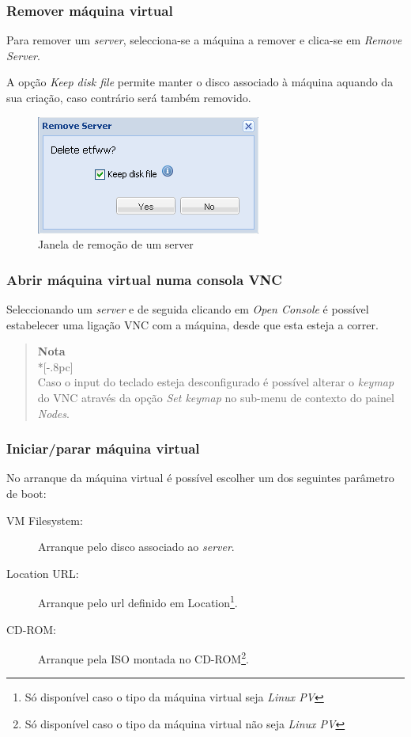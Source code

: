 \subsubsection{Remover máquina virtual}
\label{sec:remove_server}
Para remover um \emph{server}, selecciona-se a máquina a remover e clica-se em \emph{Remove Server}.

A opção \emph{Keep disk file} permite manter o disco associado à máquina aquando da sua criação, caso contrário será também removido.
		
\begin{figure}[H]
	\begin{center}
	\includegraphics[scale=0.5]{screenshots/server_remove.png}
	\caption{Janela de remoção de um server}
	\label{fig:server_remove}
	\end{center}
\end{figure}

\subsubsection{Abrir máquina virtual numa consola VNC}
\label{sec:open_vnc}

Seleccionando um \emph{server} e de seguida clicando em \emph{Open Console} é possível estabelecer uma ligação VNC com a máquina, desde que esta esteja a correr.

\begin{quote}
	{\large \bf Nota} \\*[-.8pc]
	\underline{\hspace{6in}} \\
	Caso o input do teclado esteja desconfigurado é possível alterar o \emph{keymap} do VNC através da opção \emph{Set keymap} no sub-menu de contexto do painel \emph{Nodes}.
\end{quote}

\subsubsection{Iniciar/parar máquina virtual}
\label{sec:start_server}

No arranque da máquina virtual é possível escolher um dos seguintes parâmetro de boot:
\begin{description}
	\item[VM Filesystem:] Arranque pelo disco associado ao \emph{server}.
    	\item[Location URL:] Arranque pelo url definido em Location\footnote{Só disponível caso o tipo da máquina virtual seja \emph{Linux PV}}.
	\item[CD-ROM:] Arranque pela ISO montada no CD-ROM\footnote{Só disponível caso o tipo da máquina virtual não seja \emph{Linux PV}}.
    	 
\end{description}

